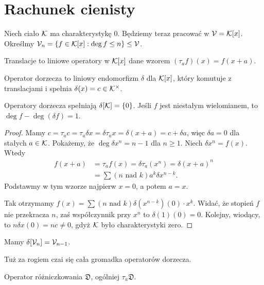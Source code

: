 \section{Rachunek cienisty}
Niech ciało $\mathcal K$ ma charakterystykę $0$.
Będziemy teraz pracować w $\mathcal V = \mathcal K[x]$.
Określmy $\mathcal V_n = \{f \in \mathcal K[x] : \deg f \le n\} \le \mathcal V$.

\begin{definicja}
	Translacje to liniowe operatory w $\mathcal K[x]$ dane wzorem $(\tau_a f)(x) = f(x +a)$.
\end{definicja}

\begin{definicja} %
	Operator dorzecza to liniowy endomorfizm $\delta$ dla $\mathcal K[x]$, który komutuje z translacjami i spełnia $\delta(x) = c \in \mathcal K^\times$.
\end{definicja}

\begin{fakt}
	Operatory dorzecza spełniają $\delta[\mathcal K] = \{0\}$.
	Jeśli $f$ jest niestałym wielomianem, to $\deg f - \deg (\delta f) = 1$.
\end{fakt}

\begin{proof}
	Mamy $c = \tau_a c = \tau_a \delta x = \delta \tau_a x= \delta(x+a) = c + \delta a$, więc $\delta a = 0$ dla stałych $a \in \mathcal K$.
	Pokażemy, że $\deg \delta x^n = n - 1$ dla $n \ge 1$.
	Niech $\delta x^n = f(x)$. Wtedy
	\begin{align*}
		f(x + a) & = \tau_a f(x) = \delta \tau_a (x^n) = \delta (x+a)^n \\
		 & = \sum (n \mbox{ nad } k) a^k \delta x^{n-k}.
	\end{align*}
	Podstawmy w tym wzorze najpierw $x = 0$, a potem $a = x$.

	Tak otrzymamy $f(x) = \sum (n \mbox { nad } k) \delta(x^{n-k})(0) \cdot x^k$.
	Widać, że stopień $f$ nie przekracza $n$, zaś współczynnik przy $x^n$ to $\delta(1)(0) = 0$.
	Kolejny, wiodący, to $n \delta x(0) = nc \neq 0$, gdyż $\mathcal K$ było charakterystyki zero.
\end{proof}

\begin{wniosek}
	Mamy $\delta[\mathcal V_n] = \mathcal V_{n-1}$.
\end{wniosek}

Tuż za rogiem czai się cała gromadka operatorów dorzecza.

\begin{przyklad}
	Operator różniczkowania $\mathfrak D$, ogólniej $\tau_a \mathfrak D$.
\end{przyklad}


